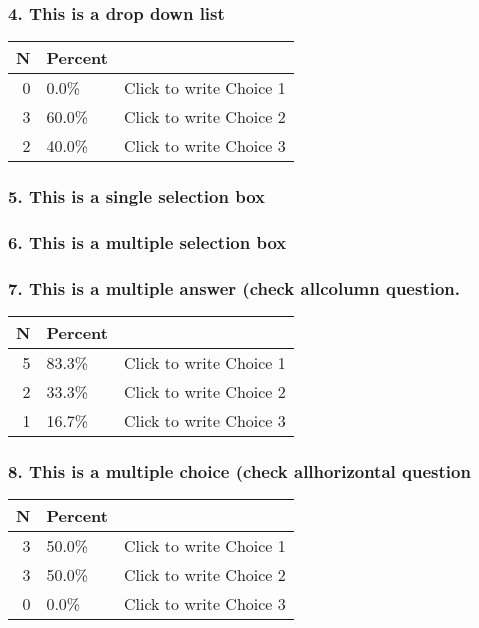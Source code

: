 \documentclass{article}\usepackage[]{graphicx}\usepackage[]{color}
\begin{document}
\hfill \break \hfill \break
\subsubsection*{4.
This is a drop down list}

\begin{tabular}{r|l|l}
\hline
N & Percent & \\
\hline
0 & 0.0\% & Click to write Choice 1\\
\hline
3 & 60.0\% & Click to write Choice 2\\
\hline
2 & 40.0\% & Click to write Choice 3\\
\hline
\end{tabular}


\hfill \break \hfill \break
\subsubsection*{5.
This is a single selection box}

\hfill \break \hfill \break
\subsubsection*{6.
This is a multiple selection box}

\hfill \break \hfill \break
\subsubsection*{7.
This is a multiple answer (check allcolumn question.}

\begin{tabular}{r|l|l}
\hline
N & Percent & \\
\hline
5 & 83.3\% & Click to write Choice 1\\
\hline
2 & 33.3\% & Click to write Choice 2\\
\hline
1 & 16.7\% & Click to write Choice 3\\
\hline
\end{tabular}


\hfill \break \hfill \break
\subsubsection*{8.
This is a multiple choice (check allhorizontal question}

\begin{tabular}{r|l|l}
\hline
N & Percent & \\
\hline
3 & 50.0\% & Click to write Choice 1\\
\hline
3 & 50.0\% & Click to write Choice 2\\
\hline
0 & 0.0\% & Click to write Choice 3\\
\hline
\end{tabular}
\end{document}
